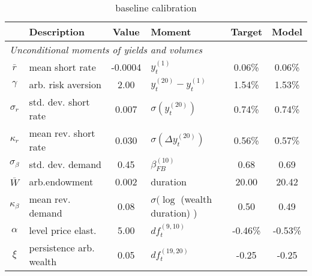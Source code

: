 \begin{table}[htbp]  
\centering  
\bgroup  
\def\arraystretch{1.25}  
\begin{tabular}{clclcc} \hline  
& Description & Value & Moment & Target & Model \\ \hline  
\multicolumn{6}{l}{\emph{Unconditional moments of yields and volumes}} \\  
$\bar{r}$  & mean short rate & -0.0004  & $y_{t}^{(1)}$ & 0.06\% & 0.06\%   \\ 
$\gamma$  & arb. risk aversion & 2.00  & $y_{t}^{(20)}-y_{t}^{(1)}$ & 1.54\% & 1.53\%   \\ 
$\sigma_r$ & std. dev. short rate & 0.007 & $\sigma ( y_{t}^{(20)} )$  & 0.74\% & 0.74\% \\ 
$\kappa_r$ & mean rev. short rate & 0.030 & $\sigma (\Delta y_{t}^{(20)})$ & 0.56\% & 0.57\% \\ 
$\sigma_{\beta}$ & std. dev. demand & 0.45 & $ \beta^{(10)}_{FB} $ & 0.68 & 0.69 \\ 
$\bar{W}$ & arb.endowment & 0.002 & duration & 20.00 & 20.42 \\ 
$\kappa_{\beta}$ & mean rev. demand & 0.08 & $\sigma (\log $ (wealth duration) ) & 0.50 & 0.49 \\ 
$\alpha$ & level price elast. & 5.00 & $ df_t^{(9,10)} $ & -0.46\% & -0.53\% \\ 
$\xi$ & persistence arb. wealth & 0.05 & $ df_t^{(19,20)} $ & -0.25 & -0.25 \\ 
\end{tabular} 
\egroup 
\caption{baseline calibration} 
\label{tab:cal} 
\end{table} 
